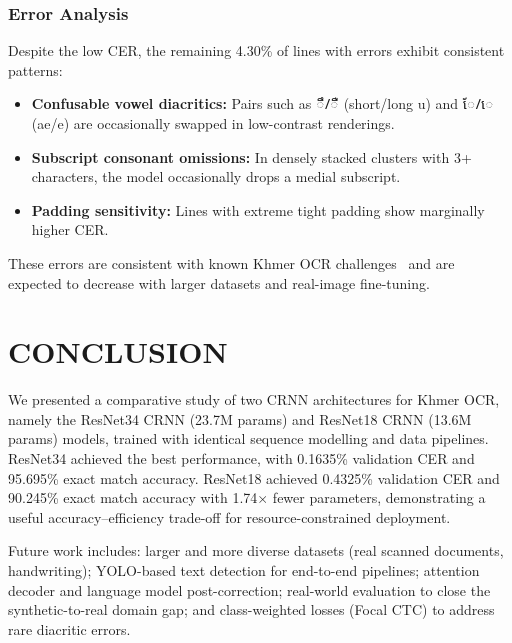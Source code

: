 \documentclass[conference]{IEEEtran}
\begin{document}
\subsubsection{Error Analysis}

Despite the low CER, the remaining 4.30\% of lines with errors exhibit
consistent patterns:
\begin{itemize}
  \item \textbf{Confusable vowel diacritics:} Pairs such as {\khmerfont ឹ}/{\khmerfont ឺ} (short/long u)
        and {\khmerfont ែ}/{\khmerfont េ} (ae/e) are occasionally swapped in low-contrast renderings.
  \item \textbf{Subscript consonant omissions:} In densely stacked clusters
        with 3+ characters, the model occasionally drops a medial subscript.
  \item \textbf{Padding sensitivity:} Lines with extreme tight padding show
        marginally higher CER.
\end{itemize}
These errors are consistent with known Khmer OCR challenges~\cite{buoy2023}
and are expected to decrease with larger datasets and real-image fine-tuning.

\section{CONCLUSION}

We presented a comparative study of two CRNN architectures for Khmer OCR, namely the
ResNet34 CRNN (23.7M params) and ResNet18 CRNN (13.6M params) models, trained with
identical sequence modelling and data pipelines. ResNet34 achieved the best
performance, with 0.1635\% validation CER and 95.695\% exact match accuracy.
ResNet18 achieved 0.4325\% validation CER and 90.245\% exact match accuracy with
1.74$\times$ fewer parameters, demonstrating a useful accuracy--efficiency
trade-off for resource-constrained deployment.

Future work includes: larger and more diverse datasets (real scanned documents,
handwriting); YOLO-based text detection for end-to-end pipelines; attention
decoder and language model post-correction; real-world evaluation to close the
synthetic-to-real domain gap; and class-weighted losses (Focal CTC) to address
rare diacritic errors.
\end{document}
